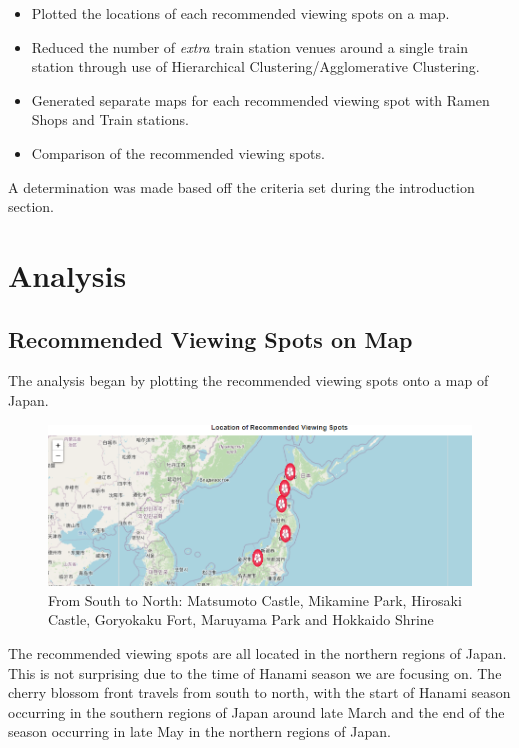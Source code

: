 \documentclass[11pt]{article}
\providecommand{\tightlist}{%
      \setlength{\itemsep}{0pt}\setlength{\parskip}{0pt}}
\begin{document}
\begin{itemize}
\tightlist
\item Plotted the locations of each recommended viewing spots on a map.
\item Reduced the number of \emph{extra} train station venues around a single train
  station through use of Hierarchical Clustering/Agglomerative Clustering.
\item Generated separate maps for each recommended viewing spot with Ramen Shops and
  Train stations.
\item Comparison of the recommended viewing spots.
\end{itemize}

A determination was made based off the criteria set during the introduction section.

    \hypertarget{analysis}{%
\section{Analysis}}\label{analysis}

    \hypertarget{recommended-viewing-spots-on-map}{%
\subsection{Recommended Viewing Spots on Map}\label{recommended-viewing-spots-on-map}}

The analysis began by plotting the recommended viewing spots onto a map of Japan. 

\begin{figure}[H]
  \centering
\includegraphics[]{images/RecommendedViewingSpots.png}
\caption{\small{From South to North: Matsumoto Castle, Mikamine Park, Hirosaki Castle, Goryokaku Fort, Maruyama Park and Hokkaido Shrine}}
\end{figure}    

The recommended viewing spots are all located in the northern regions of Japan. This is not surprising due to the time of Hanami season 
we are focusing on. The cherry blossom front travels from south to north, with the start of Hanami season occurring in the southern regions
of Japan around late March and the end of the season occurring in late May in the northern regions of Japan.
\end{document}
